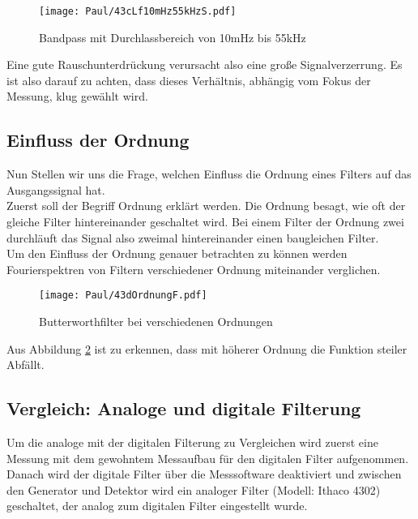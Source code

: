 \begin{figure}[h]
    \centering
    \texttt{[image: Paul/43cLf10mHz55kHzS.pdf]}
    \caption{Bandpass mit Durchlassbereich von 10mHz bis 55kHz}
    \label{fig:43cBeBa}
\end{figure}

Eine gute Rauschunterdrückung verursacht also eine große Signalverzerrung. Es ist also darauf zu achten, dass dieses Verhältnis, abhängig vom Fokus der Messung, klug gewählt wird.

\newpage
\subsection{Einfluss der Ordnung}
Nun Stellen wir uns die Frage, welchen Einfluss die Ordnung eines Filters auf das Ausgangssignal hat.\\
Zuerst soll der Begriff Ordnung erklärt werden. Die Ordnung besagt, wie oft der gleiche Filter hintereinander geschaltet wird. Bei einem Filter der Ordnung zwei durchläuft das Signal also zweimal hintereinander einen baugleichen Filter.\\

Um den Einfluss der Ordnung genauer betrachten zu können werden Fourierspektren von Filtern verschiedener Ordnung miteinander verglichen.

\begin{figure}[h]
    \centering
    \texttt{[image: Paul/43dOrdnungF.pdf]}
    \caption{Butterworthfilter bei verschiedenen Ordnungen}
    \label{fig:43dOrd}
\end{figure}

Aus Abbildung \ref{fig:43dOrd} ist zu erkennen, dass mit höherer Ordnung die Funktion steiler Abfällt.

\newpage
\subsection{Vergleich: Analoge und digitale Filterung}
Um die analoge mit der digitalen Filterung zu Vergleichen wird zuerst eine Messung mit dem gewohntem Messaufbau für den digitalen Filter aufgenommen. Danach wird der digitale Filter über die Messsoftware deaktiviert und zwischen den Generator und Detektor wird ein analoger Filter (Modell: Ithaco 4302) geschaltet, der analog zum digitalen Filter eingestellt wurde.

